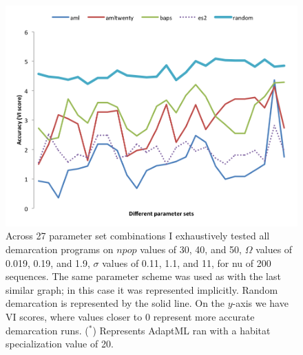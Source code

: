 \begin{figure}[h!]
  \centering
    \includegraphics[scale=0.75]{images/ResultGraphs/ResultGraphs-1}
      \caption[All demarcation graphical accuracy visualization on $nu = 200$.]{Across 27 parameter set combinations I exhaustively tested all demarcation programs on $npop$ values of 30, 40, and 50, $\Omega$ values of 0.019, 0.19, and 1.9, $\sigma$ values of 0.11, 1.1, and 11, for nu of 200 sequences. The same parameter scheme was used as with the last similar graph; in this case it was represented implicitly. Random demarcation is represented by the solid line. On the $y$-axis we have VI scores, where values closer to 0 represent more accurate demarcation runs.  ($^\ast$) Represents AdaptML ran with a habitat specialization value of 20.}
    \label{fig:All200}
\end{figure}

